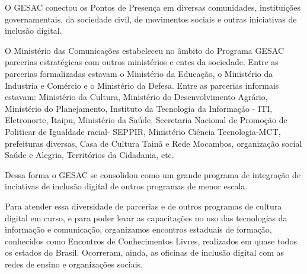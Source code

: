 \documentclass[
12pt,		%
openright,	%
twoside,  %
a4paper,			%
chapter=TITLE,		%
english,			%
french,				%
spanish,			%
brazil				%
]{USPSC-classe/USPSC}
\begin{document}
O GESAC conectou os Pontos de Presen\c{c}a em diversas comunidades, institui\c{c}\~oes governamentais, da sociedade civil, de movimentos sociais e outras iniciativas de inclus\~ao digital.

















O Minist\'erio das Comunica\c{c}\~oes estabeleceu no \^ambito do Programa GESAC parcerias estrat\'egicas com outros minist\'erios e entes da sociedade. Entre as parcerias formalizadas estavam o Minist\'erio da Educa\c{c}\~ao, o Minist\'erio da Industria e Com\'ercio e o Minist\'erio da Defesa. Entre as parcerias informais estavam: Minist\'erio da Cultura, Minist\'erio do Desenvolvimento Agr\'ario, Minist\'erio do Planejamento, Instituto da Tecnologia da Informa\c{c}\~ao - ITI, Eletronorte, Itaipu, Minist\'erio da Sa\'ude, Secretaria Nacional de Promo\c{c}\~ao de Politicar de Igualdade racial- SEPPIR, Minist\'erio Ci\^encia Tecnologia-MCT, prefeituras diversas, Casa de Cultura Tain\~a e Rede Mocambos, organiza\c{c}\~ao social \textquotedbl Sa\'ude e Alegria\textquotedbl , Territ\'orios da Cidadania, etc.

















Dessa forma o GESAC se consolidou como um grande programa de integra\c{c}\~ao de inciativas de inclus\~ao digital de outros programas de menor escala.

















Para atender essa diversidade de parcerias e de outros programas de cultura digital em curso, e para poder levar as capacita\c{c}\~oes no uso das tecnologias da informa\c{c}\~ao e comunica\c{c}\~ao, organizamos encontros estaduais de forma\c{c}\~ao, conhecidos como \textquotedbl Encontros de Conhecimentos Livres\textquotedbl , realizados em  quase todos os estados do Brasil. Ocorreram, ainda, as  oficinas de inclus\~ao digital com as redes de ensino e organiza\c{c}\~oes sociais.
\end{document}
